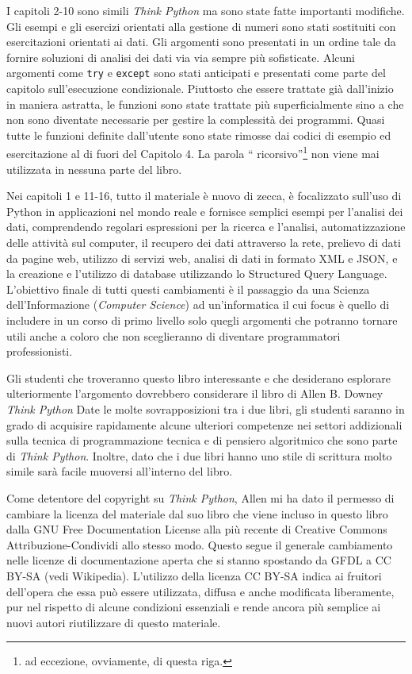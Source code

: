 I capitoli 2-10 sono simili \emph{Think Python} ma sono state fatte importanti modifiche. Gli esempi e gli esercizi orientati alla gestione di numeri sono stati sostituiti con esercitazioni orientati ai dati. Gli argomenti sono presentati in un ordine tale da fornire soluzioni di analisi dei dati via via sempre pi\`{u} sofisticate. Alcuni argomenti come {\tt try} e
{\tt except} sono stati anticipati e presentati come parte del capitolo sull'esecuzione condizionale. Piuttosto che essere trattate gi\`{a} dall'inizio in maniera astratta, le funzioni sono state trattate pi\`{u} superficialmente sino a che non sono diventate necessarie per gestire la complessit\`{a} dei programmi. Quasi tutte le funzioni definite dall'utente sono state rimosse dai codici di esempio ed esercitazione al di fuori del Capitolo 4.
La parola {``} ricorsivo''\footnote{	 ad eccezione, ovviamente, di questa riga.}  non viene mai utilizzata in nessuna parte del libro.

Nei capitoli 1 e 11-16, tutto il materiale \`{e} nuovo di zecca, \`{e} focalizzato sull'uso di Python in applicazioni nel mondo reale e fornisce semplici esempi per l'analisi dei dati, comprendendo regolari espressioni per la ricerca e l'analisi, automatizzazione delle attivit\`{a} sul computer, il recupero dei dati attraverso la rete, prelievo di dati da pagine web, utilizzo di servizi web, analisi di dati in formato XML e JSON, e la creazione e l'utilizzo di database utilizzando lo Structured Query Language.
L'obiettivo finale di tutti questi cambiamenti \`{e} il passaggio da una Scienza dell'Informazione (\emph{Computer Science}) ad un'informatica il cui focus \`{e} quello di includere in un corso di primo livello solo quegli argomenti che potranno tornare utili anche a coloro che non sceglieranno di diventare programmatori professionisti.


Gli studenti che troveranno questo libro interessante e che desiderano esplorare ulteriormente l'argomento dovrebbero considerare il libro di Allen B. Downey \emph{Think Python}  Date le molte sovrapposizioni tra i due libri, gli studenti saranno in grado di acquisire rapidamente alcune ulteriori competenze nei settori addizionali sulla tecnica di programmazione tecnica e di pensiero algoritmico che sono parte di  \emph{Think Python}.
Inoltre, dato che i due libri hanno uno stile di scrittura molto simile sar\`{a} facile muoversi all'interno del libro.

\small{
Come detentore del copyright su \emph{Think Python},
Allen mi ha dato il permesso di cambiare la licenza del materiale dal suo libro che viene incluso in questo libro dalla 
GNU Free Documentation License alla pi\`{u} recente di Creative Commons Attribuzione-Condividi allo stesso modo. Questo segue il generale cambiamento nelle licenze di documentazione aperta che si stanno spostando da GFDL a CC BY-SA (vedi Wikipedia). L'utilizzo della licenza CC BY-SA indica ai fruitori dell'opera che essa pu\`{o} essere utilizzata, diffusa e anche modificata liberamente, pur nel rispetto di alcune condizioni essenziali e rende ancora pi\`{u} semplice ai nuovi autori riutilizzare di questo materiale.}

